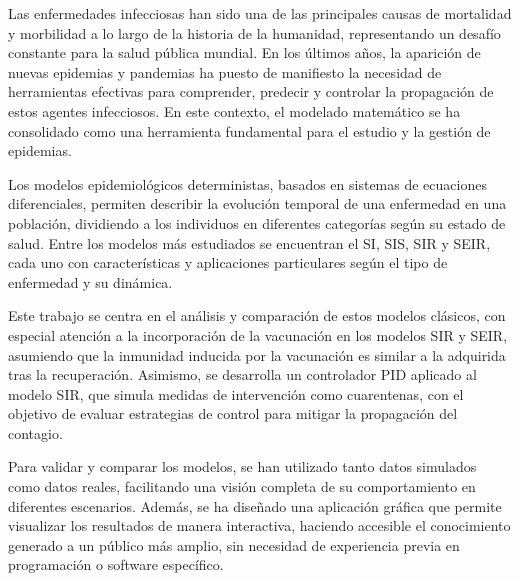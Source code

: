 Las enfermedades infecciosas han sido una de las principales causas de mortalidad y morbilidad a lo largo de la historia de la humanidad, representando un desafío constante para la salud pública mundial. En los últimos años, la aparición de nuevas epidemias y pandemias ha puesto de manifiesto la necesidad de herramientas efectivas para comprender, predecir y controlar la propagación de estos agentes infecciosos. En este contexto, el modelado matemático se ha consolidado como una herramienta fundamental para el estudio y la gestión de epidemias.

Los modelos epidemiológicos deterministas, basados en sistemas de ecuaciones diferenciales, permiten describir la evolución temporal de una enfermedad en una población, dividiendo a los individuos en diferentes categorías según su estado de salud. Entre los modelos más estudiados se encuentran el SI, SIS, SIR y SEIR, cada uno con características y aplicaciones particulares según el tipo de enfermedad y su dinámica.

Este trabajo se centra en el análisis y comparación de estos modelos clásicos, con especial atención a la incorporación de la vacunación en los modelos SIR y SEIR, asumiendo que la inmunidad inducida por la vacunación es similar a la adquirida tras la recuperación. Asimismo, se desarrolla un controlador PID aplicado al modelo SIR, que simula medidas de intervención como cuarentenas, con el objetivo de evaluar estrategias de control para mitigar la propagación del contagio.

Para validar y comparar los modelos, se han utilizado tanto datos simulados como datos reales, facilitando una visión completa de su comportamiento en diferentes escenarios. Además, se ha diseñado una aplicación gráfica que permite visualizar los resultados de manera interactiva, haciendo accesible el conocimiento generado a un público más amplio, sin necesidad de experiencia previa en programación o software específico.

